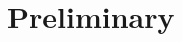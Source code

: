 \documentclass[graybox,envcountchap,envcountsame,sectrefs,fleqn]{svmono}
\begin{document}
\tableofcontents

\mainmatter%

\chapter{Preliminary}





% 


% 



% 

\backmatter%
\end{document}
